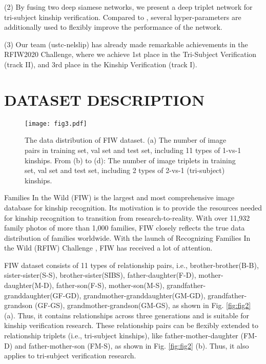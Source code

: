 \documentclass[a4paper, 10pt, conference]{ieeeconf}      %
\begin{document}
(2) By fusing two deep siamese networks, we present a deep triplet network for tri-subject kinship verification. Compared to \cite{c16}, several hyper-parameters are additionally used to flexibly improve the performance of the network. 

(3) Our team (ustc-nelslip) has already made remarkable achievements in the RFIW2020 Challenge, where we achieve 1st place in the Tri-Subject Verification (track II), and 3rd place in the Kinship Verification (track I).


\section{DATASET DESCRIPTION}

\begin{figure}[t]
\setlength{\abovecaptionskip}{0.0cm}
\setlength{\belowcaptionskip}{-0.0cm}
\begin{minipage}[b]{1.0\linewidth}
  \centering
  \centerline{\texttt{[image: fig3.pdf]}}
\end{minipage}
\caption{The data distribution of FIW dataset. (a) The number of image pairs in training set, val set and test set, including 11 types of 1-vs-1 kinships. From (b) to (d): The number of image triplets in training set, val set and test set, including 2 types of 2-vs-1 (tri-subject) kinships.}
\label{fig:fig3}
\end{figure}

Families In the Wild (FIW) \cite{c8} is the largest and most comprehensive image database for kinship recognition. Its motivation is to provide the resources needed for kinship recognition to transition from research-to-reality. With over 11,932 family photos of more than 1,000 families, FIW closely reflects the true data distribution of families worldwide. With the launch of Recognizing Families In the Wild (RFIW) Challenge \cite{c35}, FIW has received a lot of attention.

FIW dataset consists of 11 types of relationship pairs, i.e., brother-brother(B-B), sister-sister(S-S), brother-sister(SIBS), father-daughter(F-D), mother-daughter(M-D), father-son(F-S), mother-son(M-S), grandfather-granddaughter(GF-GD), grandmother-granddaughter(GM-GD), grandfather-grandson (GF-GS), grandmother-grandson(GM-GS), as shown in Fig. \ref{fig:fig2} (a). Thus, it contains relationships across three generations and is suitable for kinship verification research. These relationship pairs can be flexibly extended to relationship triplets (i.e., tri-subject kinships), like father-mother-daughter (FM-D) and father-mother-son (FM-S), as shown in Fig. \ref{fig:fig2} (b). Thus, it also applies to tri-subject verification research.
\end{document}
